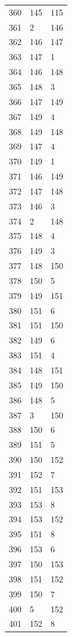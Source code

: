 \documentclass[a4paper,11pt]{article}
\begin{document}
\begin{center}
\begin{longtable}{|R{1.5cm}|R{1.5cm}|R{1.5cm}|}
  360 &  145 &  115 \\
  361 &    2 &  146 \\
  362 &  146 &  147 \\
  363 &  147 &    1 \\
  364 &  146 &  148 \\
  365 &  148 &    3 \\
  366 &  147 &  149 \\
  367 &  149 &    4 \\
  368 &  149 &  148 \\
  369 &  147 &    4 \\
  370 &  149 &    1 \\
  371 &  146 &  149 \\
  372 &  147 &  148 \\
  373 &  146 &    3 \\
  374 &    2 &  148 \\
  375 &  148 &    4 \\
  376 &  149 &    3 \\
  377 &  148 &  150 \\
  378 &  150 &    5 \\
  379 &  149 &  151 \\
  380 &  151 &    6 \\
  381 &  151 &  150 \\
  382 &  149 &    6 \\
  383 &  151 &    4 \\
  384 &  148 &  151 \\
  385 &  149 &  150 \\
  386 &  148 &    5 \\
  387 &    3 &  150 \\
  388 &  150 &    6 \\
  389 &  151 &    5 \\
  390 &  150 &  152 \\
  391 &  152 &    7 \\
  392 &  151 &  153 \\
  393 &  153 &    8 \\
  394 &  153 &  152 \\
  395 &  151 &    8 \\
  396 &  153 &    6 \\
  397 &  150 &  153 \\
  398 &  151 &  152 \\
  399 &  150 &    7 \\
  400 &    5 &  152 \\
  401 &  152 &    8 \\

\end{longtable}
\end{center}
\end{document}
